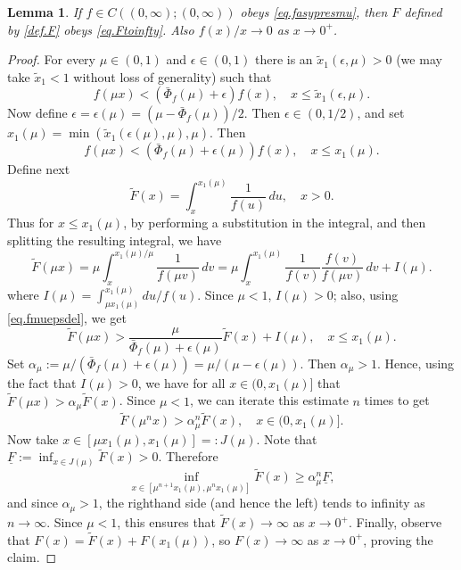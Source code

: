 \documentclass[a4paper,10pt,reqno]{amsart}
\numberwithin{equation}{section}
\newtheorem{lemma}{Lemma}
\theoremstyle{definition}
\theoremstyle{remark}
\DeclareMathOperator{\1}{\mathbbm 1}
\begin{document}
	\begin{lemma} \label{lemma.Ftoinftyfderiv0}
		If $f\in C((0,\infty);(0,\infty))$ obeys \eqref{eq.fasypresmu}, then $F$ defined by \eqref{def.F} obeys \eqref{eq.Ftoinfty}. Also 
		$f(x)/x\to 0$ as $x\to 0^+$. 
	\end{lemma}
	\begin{proof}
		For every $\mu\in (0,1)$ and $\epsilon\in (0,1)$ there is an $\tilde{x}_1(\epsilon,\mu)>0$ (we may take $\tilde{x}_1<1$ without loss of generality) such that 
		\[
		f(\mu x)< (\bar{\Phi}_f(\mu)+\epsilon)f(x), \quad x\leq \tilde{x}_1(\epsilon,\mu).
		\]	
		Now define $\epsilon=\epsilon(\mu)=(\mu-\bar{\Phi}_f(\mu))/2$. Then $\epsilon\in (0,1/2)$, and set $x_1(\mu)=\min(\tilde{x}_1(\epsilon(\mu),\mu), \mu)$. Then 
		\begin{equation} \label{eq.fmuepsdel}
			f(\mu x)< (\bar{\Phi}_f(\mu)+\epsilon(\mu))f(x), \quad x\leq x_1(\mu).
		\end{equation}
		Define next 
		\[
		\tilde{F}(x)=\int_x^{x_1(\mu)} \frac{1}{f(u)}\,du, \quad x>0.	
		\]
		Thus for $x\leq x_1(\mu)$, by performing a substitution in the integral, and then splitting the resulting integral, we have 
		\[
		\tilde{F}(\mu x)= \mu\int_{x}^{x_1(\mu)/\mu} \frac{1}{f(\mu v)}\,dv
		=\mu\int_{x}^{x_1(\mu)} \frac{1}{f(v)}\frac{f(v)}{f(\mu v)}\,dv + I(\mu).
		\]
		where $I(\mu)=\int_{\mu x_1(\mu)}^{x_1(\mu)} du/f(u)$. Since $\mu<1$, $I(\mu)>0$; also, using \eqref{eq.fmuepsdel}, we get 
		\[
		\tilde{F}(\mu x)> \frac{\mu}{\bar{\Phi}_f(\mu)+\epsilon(\mu)}\tilde{F}(x) + I(\mu), \quad x\leq x_1(\mu).
		\]  
		Set $\alpha_\mu:=\mu/(\bar{\Phi}_f(\mu)+\epsilon(\mu))=\mu/(\mu-\epsilon(\mu))$. Then $\alpha_\mu>1$. Hence, using the fact that $I(\mu)>0$, we have for all $x\in (0,x_1(\mu)]$ that $\tilde{F}(\mu x)>\alpha_\mu \tilde{F}(x)$. 
		Since $\mu<1$, we can iterate this estimate $n$ times to get 
		\[
		\tilde{F}(\mu^n x)> \alpha_\mu^n \tilde{F}(x), \quad x\in (0,x_1(\mu)].
		\] 
		Now take $x\in [\mu x_1(\mu),x_1(\mu)]=:J(\mu)$. Note that $\underline{F}:=\inf_{x\in J(\mu)} \tilde{F}(x)>0$. Therefore 
		\[
		\inf_{x\in [\mu^{n+1}x_1(\mu),\mu^n x_1(\mu)]} \tilde{F}(x)\geq \alpha_\mu^n \underline{F},
		\]
		and since $\alpha_\mu>1$, the righthand side (and hence the left) tends to infinity as $n\to\infty$. Since $\mu<1$, this ensures that $\tilde{F}(x)\to \infty$ as $x\to 0^+$. Finally, observe that 
		$F(x)=\tilde{F}(x)+F(x_1(\mu))$, so $F(x)\to \infty$ as $x\to 0^+$, proving the claim. 
		

\end{proof}
\end{document}
